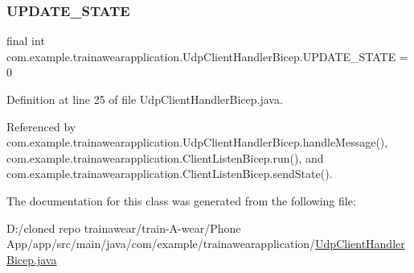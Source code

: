 \subsubsection{\texorpdfstring{UPDATE\_STATE}{UPDATE\_STATE}}
{\footnotesize\ttfamily final int com.\+example.\+trainawearapplication.\+Udp\+Client\+Handler\+Bicep.\+U\+P\+D\+A\+T\+E\+\_\+\+S\+T\+A\+TE = 0\hspace{0.3cm}{\ttfamily [static]}}



Definition at line 25 of file Udp\+Client\+Handler\+Bicep.\+java.



Referenced by com.\+example.\+trainawearapplication.\+Udp\+Client\+Handler\+Bicep.\+handle\+Message(), com.\+example.\+trainawearapplication.\+Client\+Listen\+Bicep.\+run(), and com.\+example.\+trainawearapplication.\+Client\+Listen\+Bicep.\+send\+State().



The documentation for this class was generated from the following file\+:\begin{DoxyCompactItemize}
\item 
D\+:/cloned repo trainawear/train-\/\+A-\/wear/\+Phone App/app/src/main/java/com/example/trainawearapplication/\mbox{\hyperlink{_udp_client_handler_bicep_8java}{Udp\+Client\+Handler\+Bicep.\+java}}\end{DoxyCompactItemize}
